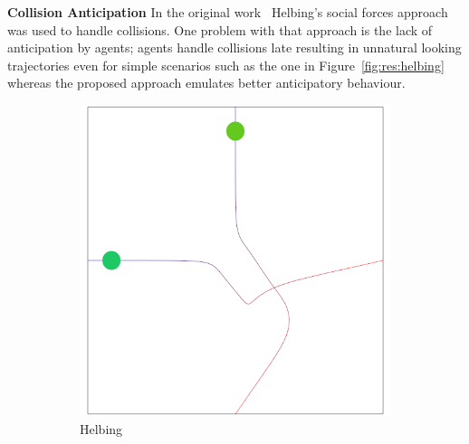 

\textbf{Collision Anticipation}
In the original work~\cite{Yersin:2009} Helbing's social forces \cite{Helbing:2005} approach was used to handle collisions.
One problem with that approach is the lack of anticipation by agents; agents handle collisions late resulting in unnatural looking trajectories even for simple scenarios such as the one in Figure~\ref{fig:res:helbing} whereas the proposed approach emulates better anticipatory behaviour.

\begin{figure}[t]
	\centering
	\begin{subfigure}[b]{0.49\linewidth}
	 \centering
		\includegraphics[width=\linewidth]{images/res-helbing-crossing.png}
		\caption{Helbing}
	 \end{subfigure}
	\begin{subfigure}[b]{0.49\linewidth}
	 \centering

\end{subfigure}
\end{figure}
